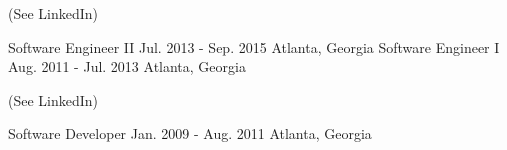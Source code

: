 (See LinkedIn)
\begin{cvhonors}
  \cvhonor
    {Software Engineer II}
    {Jul. 2013 - Sep. 2015}
    {Atlanta, Georgia}
    {}
  \cvhonor
    {Software Engineer I}
    {Aug. 2011 - Jul. 2013}
    {Atlanta, Georgia}
    {}
\end{cvhonors}

(See LinkedIn)
\begin{cvhonors}
  \cvhonor
    {Software Developer}
    {Jan. 2009 - Aug. 2011}
    {Atlanta, Georgia}
    {}
\end{cvhonors}
